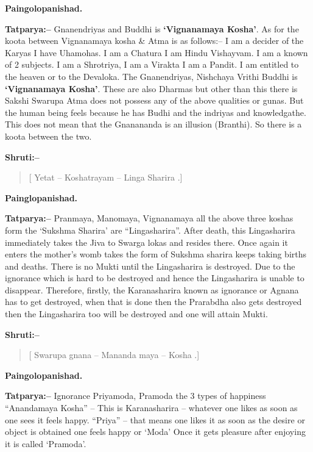 \begin{flushright}
\textbf{Paingolopanishad.}
\end{flushright}

\textbf{Tatparya:–} Gnanendriyas and Buddhi is \textbf{‘Vignanamaya Kosha’}. As for the koota between Vignanamaya kosha \& Atma is as follows:– I am a decider of the Karyas I have Uhamohas. I am a Chatura I am Hindu Vishayvam. I am a known of 2 subjects. I am a Shrotriya, I am a Virakta I am a Pandit. I am entitled to the heaven or to the Devaloka. The Gnanendriyas, Nishchaya Vrithi Buddhi is \textbf{‘Vignanamaya Kosha’}. These are also Dharmas but other than this there is Sakshi Swarupa Atma does not possess any of the above qualities or gunas. But the human being feels because he has Budhi and the indriyas and knowledgathe. This does not mean that the Gnanananda is an illusion (Branthi). So there is a koota between the two.

\textbf{Shruti:–}

\begin{verse}
[ Yetat – Koshatrayam – Linga Sharira .]
\end{verse}

\begin{flushright}
\textbf{Painglopanishad.}
\end{flushright}

\textbf{Tatparya:–} Pranmaya, Manomaya, Vignanamaya all the above three koshas form the ‘Sukshma Sharira’ are “Lingasharira”. After death, this Lingasharira immediately takes the Jiva to Swarga lokas and resides there. Once again it enters the mother's womb takes the form of Sukshma sharira keeps taking births and deaths. There is no Mukti until the Lingasharira is destroyed. Due to the ignorance which is hard to be destroyed and hence the Lingasharira is unable to disappear. Therefore, firstly, the Karanasharira known as ignorance or Agnana has to get destroyed, when that is done then the Prarabdha also gets destroyed then the Lingasharira too will be destroyed and one will attain Mukti.

\textbf{Shruti:–}

\begin{verse}
[ Swarupa gnana – Mananda maya – Kosha .]
\end{verse}

\begin{flushright}
\textbf{Paingolopanishad.}
\end{flushright}

\textbf{Tatparya:–} Ignorance Priyamoda, Pramoda the 3 types of happiness “Anandamaya Kosha” – This is Karanasharira – whatever one likes as soon as one sees it feels happy. “Priya” – that means one likes it as soon as the desire or object is obtained one feels happy or ‘Moda’ Once it gets pleasure after enjoying it is called ‘Pramoda’.

